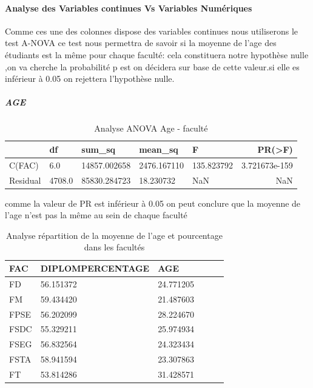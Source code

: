  \paragraph{Analyse des Variables continues Vs Variables Numériques}
 Comme ces une des colonnes dispose des variables continues nous 
 utiliserons le test A-NOVA
 ce test nous permettra de savoir si la moyenne de l'age des étudiants
 est la même pour chaque faculté: cela constituera notre hypothèse nulle
 ,on va cherche la probabilité p est on décidera sur base de cette valeur.si elle es inférieur à 0.05 on rejettera l'hypothèse nulle.
\subparagraph{AGE}
 \begin{table}[!htbp]
 	\centering
 	\begingroup %
 	\captionsetup{type=table} %
 	\caption{Analyse ANOVA Age - faculté}
 	\label{tab:ANOVAAge}
 	\begin{tabular}{lllllr}
 		\toprule
 		{} & df     &   sum\_sq &     mean\_sq      &     F    &     PR(>F) \\
 		\midrule
 		C(FAC)    &   6.0 &  14857.002658 & 2476.167110 & 135.823792  &3.721673e-159 \\
 		Residual & 4708.0  &85830.284723    &18.230732    &     NaN    &        NaN \\
 		\bottomrule
 	\end{tabular}
 	\endgroup
 \end{table}
 comme la valeur de PR est inférieur à 0.05 on peut conclure que la
 moyenne de l'age n'est pas la même au sein de chaque faculté
\begin{table}[!htbp]
	\centering
	\begingroup %
	\captionsetup{type=table} %
	\caption{Analyse répartition de la moyenne de l'age et pourcentage dans les facultés}
	\label{tab:ANOVAge}
	\begin{tabular}{lllllr}
		\toprule
		FAC & DIPLOMPERCENTAGE &       AGE \\
		\midrule
		FD          &      56.151372  &24.771205 \\
		FM            &   59.434420 & 21.487603\\
		FPSE         &     56.202099  &28.224670\\
		FSDC      &        55.329211 & 25.974934\\
		FSEG        &   56.832564 & 24.323434\\
		FSTA       &      58.941594 & 23.307863\\
		FT       &         53.814286 & 31.428571\\
		\bottomrule
	\end{tabular}
	\endgroup
\end{table}
